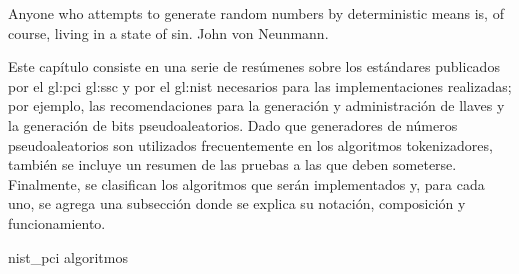 %
%
%

\label{sec:generacion_de_tokens}
{%
  Anyone who attempts to generate random numbers by deterministic means is, of
  course, living in a state of sin.%
}
{%
   John von Neunmann.%
}

\noindent
Este capítulo consiste en una serie de resúmenes sobre los estándares publicados
por el \gls{gl:pci} \gls{gl:ssc} y por el \gls{gl:nist} necesarios para las
implementaciones realizadas; por ejemplo, las recomendaciones para la
generación y administración de llaves y la generación de bits pseudoaleatorios.
Dado que generadores de números pseudoaleatorios son utilizados frecuentemente
en los algoritmos tokenizadores, también se incluye un resumen de las pruebas a
las que deben someterse. Finalmente, se clasifican los algoritmos que serán
implementados y, para cada uno, se agrega una subsección donde se explica su
notación, composición y funcionamiento.

{nist_pci}
{algoritmos}
